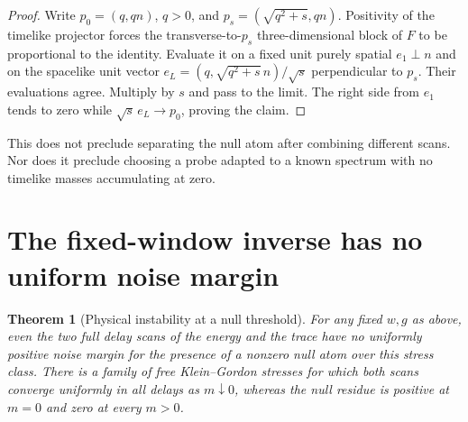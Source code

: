 \documentclass[11pt]{article}
\newtheorem{theorem}{Theorem}[section]
\theoremstyle{remark}
\begin{document}
\begin{proof}
Write \(p_0=(q,qn)\), \(q>0\), and
\(p_s=(\sqrt{q^2+s},qn)\). Positivity of the timelike projector
forces the transverse-to-\(p_s\) three-dimensional block of \(F\)
to be proportional to the identity. Evaluate it on a fixed
unit purely spatial \(e_1\perp n\) and on the spacelike unit
vector \(e_L=(q,\sqrt{q^2+s}\,n)/\sqrt s\) perpendicular to \(p_s\).
Their evaluations agree. Multiply by \(s\) and pass to the
limit. The right side from \(e_1\) tends to zero while
\(\sqrt s\,e_L\to p_0\), proving the claim.
\end{proof}
This does not preclude separating the null atom after combining
different scans. Nor does it preclude choosing a probe adapted to
a known spectrum with no timelike masses accumulating at zero.

\section{The fixed-window inverse has no uniform noise margin}
\label{sec:noise}

\begin{theorem}[Physical instability at a null threshold]
\label{thm:noise}
For any fixed \(w,g\) as above, even the two full delay scans
of the energy and the trace have no uniformly positive
noise margin for the presence of a nonzero null atom over
this stress class. There is a family of free Klein--Gordon
stresses for which both scans converge uniformly in all delays
as \(m\downarrow0\), whereas the null residue is positive at
\(m=0\) and zero at every \(m>0\).
\end{theorem}
\end{document}
